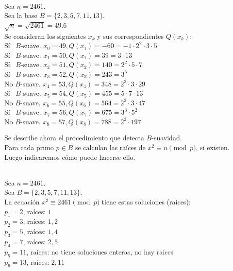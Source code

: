 \begin{ejemplo} \, \\
Sea $n = 2461$. \\
Sea la base $B = \{2, 3, 5, 7, 11,13\}$. \\
$\sqrt n = \sqrt {2461} = 49.6$ \\
Se consideran los siguientes $x_k$ y sus correspondientes $Q(x_k)$: \\
Sí \, $B$-suave. $x_0= 49, Q(x_1)=-60=-1 \cdot 2^2 \cdot 3 \cdot  5$  \\
Sí \, $B$-suave. $x_1= 50, Q(x_1)=39=3 \cdot 13$  \\
Sí \, $B$-suave. $x_2= 51, Q(x_2)=140=2^2 \cdot 5 \cdot 7$ \\
Sí \, $B$-suave. $x_3= 52, Q(x_3)=243=3^5$ \\
No $B$-suave. $x_4= 53, Q(x_4)=348=2^2 \cdot 3 \cdot 29$\\
Sí \, $B$-suave. $x_5= 54, Q(x_5)=455=5 \cdot 7 \cdot 13$ \\
No $B$-suave. $x_6= 55, Q(x_6)=564=2^2 \cdot 3 \cdot 47$ \\
Sí \, $B$-suave. $x_7= 56, Q(x_7)=675=3^3 \cdot 5^2$ \\
No $B$-suave. $x_8= 57, Q(x_8)=788=2^2 \cdot 197$ \\
\end{ejemplo}

Se describe ahora el procedimiento que detecta $B$-suavidad. \\
Para cada primo $p \in B$ se calculan las raíces de $x^2 \equiv n \pmod p$, si existen. \\
Luego indicaremos cómo puede hacerse ello.

\begin{ejemplo} \, \\
Sea $n = 2461$. \\
Sea $B = \{2, 3, 5, 7, 11,13\}$. \\
La ecuación $x^2 \equiv 2461 \pmod p$ tiene estas soluciones (raíces): \\
$p_1= 2$, raíces: $1$ \\ 
$p_2= 3$, raíces: $1,2$ \\ 
$p_3= 5$, raíces: $1,4$ \\ 
$p_4= 7$, raíces: $2,5$ \\ 
$p_5= 11$, raíces: no tiene soluciones enteras, no hay raíces \\ 
$p_6= 13$, raíces: $2, 11$ \\ 
\end{ejemplo}


